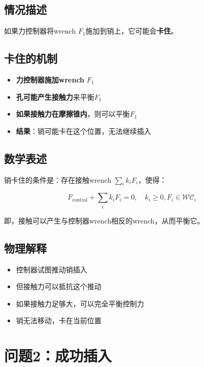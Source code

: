 \documentclass[12pt,a4paper]{article}
\begin{document}
\subsection{情况描述}

如果力控制器将wrench $F_1$施加到销上，它可能会\textbf{卡住}。

\subsection{卡住的机制}

\begin{itemize}
    \item \textbf{力控制器施加wrench} $F_1$
    \item \textbf{孔可能产生接触力}来平衡$F_1$
    \item \textbf{如果接触力在摩擦锥内}，则可以平衡$F_1$
    \item \textbf{结果}：销可能卡在这个位置，无法继续插入
\end{itemize}

\subsection{数学表述}

销卡住的条件是：存在接触wrench $\sum_i k_i F_i$，使得：

\begin{equation}
F_{\text{control}} + \sum_i k_i F_i = 0, \quad k_i \geq 0, F_i \in \mathcal{WC}_i
\end{equation}

即，接触可以产生与控制器wrench相反的wrench，从而平衡它。

\subsection{物理解释}

\begin{itemize}
    \item 控制器试图推动销插入
    \item 但接触力可以抵抗这个推动
    \item 如果接触力足够大，可以完全平衡控制力
    \item 销无法移动，卡在当前位置
\end{itemize}

\section{问题2：成功插入}
\end{document}
